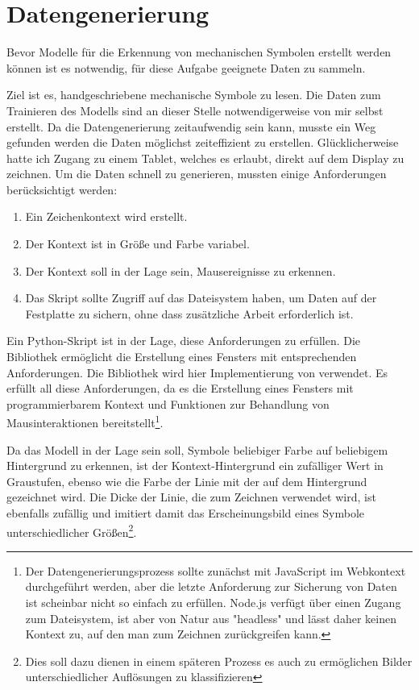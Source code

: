 \section{Datengenerierung}

Bevor Modelle für die Erkennung von
mechanischen Symbolen erstellt werden können ist es notwendig, für diese Aufgabe geeignete Daten zu sammeln.

Ziel ist es, handgeschriebene mechanische Symbole zu lesen.
Die Daten zum Trainieren des Modells sind an dieser Stelle notwendigerweise von mir selbst erstellt.
Da die Datengenerierung zeitaufwendig sein kann, musste ein Weg gefunden werden die Daten möglichst zeiteffizient zu erstellen.
Glücklicherweise hatte ich Zugang zu einem Tablet, welches es erlaubt, direkt auf dem Display zu zeichnen.
Um die Daten schnell zu generieren, mussten einige Anforderungen berücksichtigt werden:

\begin{enumerate}
    \item Ein Zeichenkontext wird erstellt.
    \item Der Kontext ist in Größe und Farbe variabel.
    \item Der Kontext soll in der Lage sein, Mausereignisse zu erkennen.
    \item Das Skript sollte Zugriff auf das Dateisystem haben, um Daten auf der Festplatte zu sichern, ohne dass zusätzliche Arbeit erforderlich ist.
\end{enumerate}

Ein Python-Skript ist in der Lage, diese Anforderungen zu erfüllen.
Die Bibliothek  \cite{OpenCV2019} ermöglicht die Erstellung eines Fensters mit entsprechenden Anforderungen. Die Bibliothek  \cite{Heinisuo2019} wird hier Implementierung von  verwendet.
Es erfüllt all diese Anforderungen, da es die Erstellung eines Fensters mit programmierbarem Kontext und Funktionen zur Behandlung von Mausinteraktionen bereitstellt\footnote{ Der Datengenerierungsprozess sollte zunächst mit JavaScript im Webkontext durchgeführt werden, aber die letzte Anforderung zur Sicherung von Daten ist scheinbar nicht so einfach zu erfüllen. Node.js verfügt über einen Zugang zum Dateisystem, ist aber von Natur aus "headless" und lässt daher keinen Kontext zu, auf den man zum Zeichnen zurückgreifen kann. }.

Da das Modell in der Lage sein soll, Symbole beliebiger Farbe auf beliebigem Hintergrund zu erkennen, ist der Kontext-Hintergrund ein zufälliger Wert in Graustufen, ebenso wie die Farbe der Linie mit der auf dem Hintergrund gezeichnet wird.
Die Dicke der Linie, die zum Zeichnen verwendet wird, ist ebenfalls zufällig und imitiert damit das Erscheinungsbild eines Symbole unterschiedlicher Größen\footnote{Dies soll dazu dienen in einem späteren Prozess es auch zu ermöglichen Bilder unterschiedlicher Auflösungen zu klassifizieren}.

